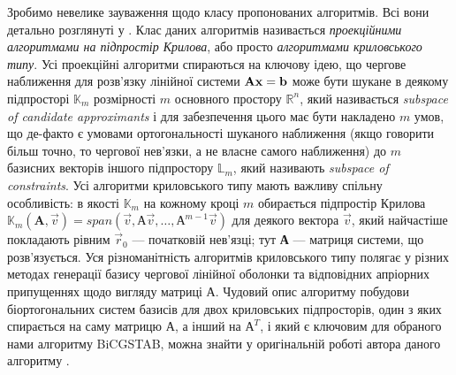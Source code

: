 Зробимо невелике зауваження щодо класу пропонованих алгоритмів. Всі вони детально розглянуті у \cite{saad}. Клас даних алгоритмів називається \textit{проекційними алгоритмами на підпростір Крилова}, або просто \textit{алгоритмами криловського типу}. Усі проекційні алгоритми спираються на ключову ідею, що чергове наближення для розв’язку лінійної системи $\bf A x = \bf b$ може бути шукане в деякому підпросторі $\mathbb{K}_m$ розмірності $m$ основного простору $\mathbb{R}^n$, який називається \textit{subspace of candidate approximants} і для забезпечення цього має бути накладено $m$ умов, що де-факто є умовами ортогональності шуканого наближення (якщо говорити більш точно, то чергової нев’язки, а не власне самого наближення) до $m$ базисних векторів іншого підпростору $\mathbb{L}_m$, який називають \textit{subspace of constraints}. Усі алгоритми криловського типу мають важливу спільну особливість: в якості $\mathbb{K}_m$ на кожному кроці $m$ обирається підпростір Крилова $\mathbb{K}_m(\textbf{A},\vec{v}) = span(\vec{v}, \textbf{А}\vec{v}, \dots, \textbf{А}^{m-1}\vec{v})$ для деякого вектора $\vec{v}$, який найчастіше покладають рівним $\vec{r}_0$ --- початковій нев’язці; тут \textbf{А} --- матриця системи, що розв’язується. Уся різноманітність алгоритмів криловського типу полягає у різних методах генерації базису чергової лінійної оболонки та відповідних апріорних припущеннях щодо вигляду матриці $\textbf{А}$. Чудовий опис алгоритму побудови біортогональних систем базисів для двох криловських підпросторів, один з яких спирається на саму матрицю $\textbf{А}$, а інший на $\textbf{А}^T$, і який є ключовим для обраного нами алгоритму  BiCGSTAB, можна знайти у оригінальній роботі автора даного алгоритму \cite{lanczos}.